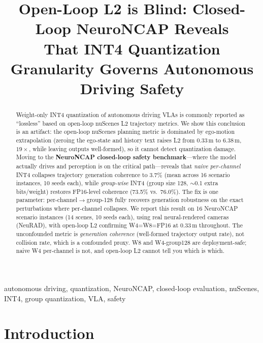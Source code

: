 \documentclass[conference]{IEEEtran}
\begin{document}
\title{Open-Loop L2 is Blind: Closed-Loop NeuroNCAP Reveals\\
That INT4 Quantization Granularity Governs Autonomous Driving Safety}

\author{
}

\maketitle

\begin{abstract}
Weight-only INT4 quantization of autonomous driving VLAs is commonly reported as ``lossless''
based on open-loop nuScenes L2 trajectory metrics. We show this conclusion is an artifact: the
open-loop nuScenes planning metric is dominated by ego-motion extrapolation (zeroing the ego-state
and history text raises L2 from 0.33\,m to 6.38\,m, $19\times$, while leaving outputs well-formed),
so it cannot detect quantization damage. Moving to the \textbf{NeuroNCAP closed-loop safety
benchmark}---where the model actually drives and perception is on the critical path---reveals that
\emph{naive per-channel} INT4 collapses trajectory generation coherence to 3.7\% (mean across 16
scenario instances, 10 seeds each), while \emph{group-wise} INT4 (group size 128, $\sim$0.1 extra
bits/weight) restores FP16-level coherence (73.5\% vs.\ 76.0\%). The fix is one parameter:
per-channel$\to$group-128 fully recovers generation robustness on the exact perturbations where
per-channel collapses. We report this result on 16 NeuroNCAP scenario instances (14 scenes, 10
seeds each), using real neural-rendered cameras (NeuRAD), with open-loop L2 confirming W4=W8=FP16
at 0.33\,m throughout. The unconfounded metric is \emph{generation coherence} (well-formed
trajectory output rate), not collision rate, which is a confounded proxy. W8 and W4-group128 are
deployment-safe; naive W4 per-channel is not, and open-loop L2 cannot tell you which is which.
\end{abstract}

\begin{IEEEkeywords}
autonomous driving, quantization, NeuroNCAP, closed-loop evaluation, nuScenes, INT4,
group quantization, VLA, safety
\end{IEEEkeywords}

\section{Introduction}
\label{sec:intro}
\end{document}
